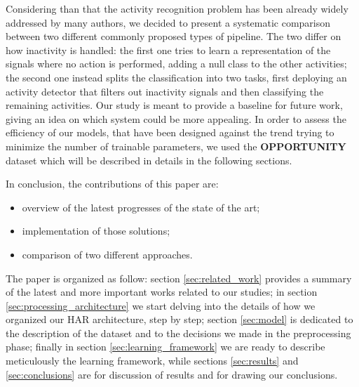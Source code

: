 Considering than that the activity recognition problem has been already widely addressed by many authors, we decided to present a systematic comparison between two different commonly proposed types of pipeline.
The two differ on how inactivity is handled: the first one tries to learn a representation of the signals where no action is performed, adding a null class to the other activities; the second one instead splits the classification into two tasks, first deploying an activity detector that filters out inactivity signals and then classifying the remaining activities.
Our study is meant to provide a baseline for future work, giving an idea on which system could be more appealing.
In order to assess the efficiency of our models, that have been designed against the trend trying to minimize the number of trainable parameters, we used the \textbf{OPPORTUNITY} dataset \cite{Chavarriaga2013, ComplexAct-2010} which will be described in details in the following sections.

In conclusion, the contributions of this paper are:
\begin{itemize}
	\item overview of the latest progresses of the state of the art;
	\item implementation of those solutions;
	\item comparison of two different approaches. 
\end{itemize}
 
The paper is organized as follow: section \ref{sec:related_work} provides a summary of the latest and more important works related to our studies; in section \ref{sec:processing_architecture} we start delving into the details of how we organized our HAR architecture, step by step; section \ref{sec:model} is dedicated to the description of the dataset and to the decisions we made in the preprocessing phase; finally in section \ref{sec:learning_framework} we are ready to describe meticulously the learning framework, while sections \ref{sec:results} and \ref{sec:conclusions} are for discussion of results and for drawing our conclusions. 